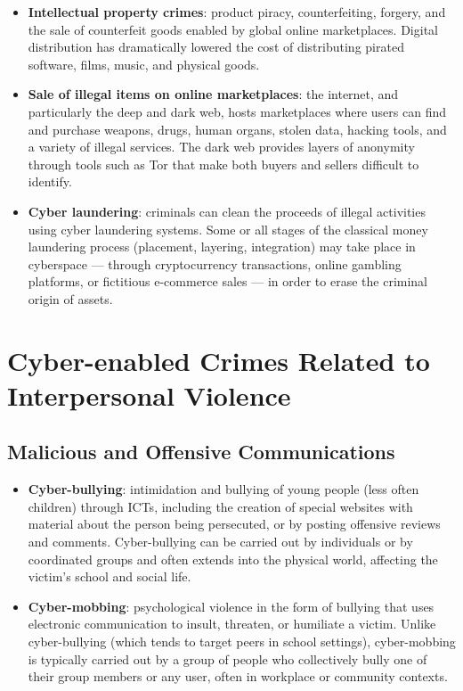\documentclass[11pt,a4paper,openany]{report}
\theoremstyle{definition}
\theoremstyle{plain}
\theoremstyle{remark}
\begin{document}
\begin{itemize}
    \item \textbf{Intellectual property crimes}: product piracy, counterfeiting, forgery, and the sale of counterfeit goods enabled by global online marketplaces. Digital distribution has dramatically lowered the cost of distributing pirated software, films, music, and physical goods.

    \item \textbf{Sale of illegal items on online marketplaces}: the internet, and particularly the deep and dark web, hosts marketplaces where users can find and purchase weapons, drugs, human organs, stolen data, hacking tools, and a variety of illegal services. The dark web provides layers of anonymity through tools such as Tor that make both buyers and sellers difficult to identify.

    \item \textbf{Cyber laundering}: criminals can clean the proceeds of illegal activities using cyber laundering systems. Some or all stages of the classical money laundering process (placement, layering, integration) may take place in cyberspace --- through cryptocurrency transactions, online gambling platforms, or fictitious e-commerce sales --- in order to erase the criminal origin of assets.
\end{itemize}


\section{Cyber-enabled Crimes Related to Interpersonal Violence}

\subsection{Malicious and Offensive Communications}

\begin{itemize}
    \item \textbf{Cyber-bullying}: intimidation and bullying of young people (less often children) through ICTs, including the creation of special websites with material about the person being persecuted, or by posting offensive reviews and comments. Cyber-bullying can be carried out by individuals or by coordinated groups and often extends into the physical world, affecting the victim's school and social life.

    \item \textbf{Cyber-mobbing}: psychological violence in the form of bullying that uses electronic communication to insult, threaten, or humiliate a victim. Unlike cyber-bullying (which tends to target peers in school settings), cyber-mobbing is typically carried out by a group of people who collectively bully one of their group members or any user, often in workplace or community contexts.
\end{itemize}
\end{document}
